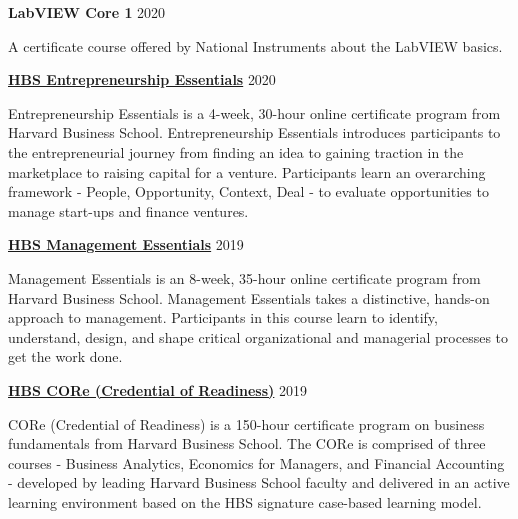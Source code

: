 \documentclass[margin,line]{res}
\begin{document}
\begin{resume}
{\bf LabVIEW Core 1} \hfill {2020}\\
\vspace*{-3.5mm}
\begin{addmargin}[0pt]{.1\linewidth}
\vspace*{-1mm}
A certificate course offered by National Instruments about the LabVIEW basics.
\end{addmargin}

\vspace*{-2mm}

{\bf \href{https://online.hbs.edu/courses/entrepreneurship-essentials/}{HBS Entrepreneurship Essentials}} \hfill {2020}\\
\vspace*{-3.5mm}
\begin{addmargin}[0pt]{.1\linewidth}
\vspace*{-1mm}
Entrepreneurship Essentials is a 4-week, 30-hour online certificate program from Harvard Business School. Entrepreneurship Essentials introduces participants to the entrepreneurial journey from finding an idea to gaining traction in the marketplace to raising capital for a venture. Participants learn an overarching framework - People, Opportunity, Context, Deal - to evaluate opportunities to manage start-ups and finance ventures.
\end{addmargin}

\vspace*{-2mm}

{\bf \href{https://online.hbs.edu/courses/management-essentials/}{HBS Management Essentials}} \hfill {2019}\\
\vspace*{-3.5mm}
\begin{addmargin}[0pt]{.1\linewidth}
\vspace*{-1mm}
Management Essentials is an 8-week, 35-hour online certificate program from Harvard Business School. Management Essentials takes a distinctive, hands-on approach to management. Participants in this course learn to identify, understand, design, and shape critical organizational and managerial processes to get the work done.
\end{addmargin}

\vspace*{-2mm}

{\bf \href{https://online.hbs.edu/courses/core/}{HBS CORe (Credential of Readiness)}} \hfill {2019}\\
\vspace*{-3.5mm}
\begin{addmargin}[0pt]{.1\linewidth}
\vspace*{-1mm}
CORe (Credential of Readiness) is a 150-hour certificate program on business fundamentals from Harvard Business School. The CORe is comprised of three courses - Business Analytics, Economics for Managers, and Financial Accounting - developed by leading Harvard Business School faculty and delivered in an active learning environment based on the HBS signature case-based learning model.
\end{addmargin}


\end{resume}
\end{document}

